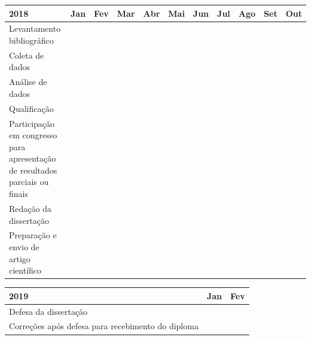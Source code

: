 \documentclass[oneside, 12pt,article, a4paper]{memoir}
\begin{document}
\begin{table}[!htb]
\footnotesize
\centering
\begin{tabular}{|p{4cm}|c|c|c|c|c|c|c|c|c|c|}
\hline
\textbf{2018} &
  \multicolumn{1}{l|}{\textbf{Jan}} &
  \multicolumn{1}{l|}{\textbf{Fev}} &
  \multicolumn{1}{l|}{\textbf{Mar}} &
  \multicolumn{1}{l|}{\textbf{Abr}} &
  \multicolumn{1}{l|}{\textbf{Mai}} &
  \multicolumn{1}{l|}{\textbf{Jun}} &
  \multicolumn{1}{l|}{\textbf{Jul}} &
  \multicolumn{1}{l|}{\textbf{Ago}} &
  \multicolumn{1}{l|}{\textbf{Set}} &
  \multicolumn{1}{l|}{\textbf{Out}} \\ \hline
Levantamento bibliográfico                                                   &  &  &  &  &  &  &  &  &  &  \\ \hline
Coleta de dados                                                              &  &  &  &  &  &  &  &  &  &  \\ \hline
Análise de dados                                                             &  &  &  &  &  &  &  &  &  &  \\ \hline
Qualificação                                                                 &  &  &  &  &  &  &  &  &  &  \\ \hline
Participação em congresso para apresentação de resultados parciais ou finais &  &  &  &  &  &  &  &  &  &  \\ \hline
Redação da dissertação                                                       &  &  &  &  &  &  &  &  &  &  \\ \hline
Preparação e envio de artigo científico                                      &  &  &  &  &  &  &  &  &  &  \\ \hline
\end{tabular}
\end{table}


\begin{table}[!htb]
\footnotesize
\begin{tabular}{|p{4cm}|c|c|}
\hline
\textbf{2019}                                     & \multicolumn{1}{l|}{\textbf{Jan}} & \multicolumn{1}{l|}{\textbf{Fev}} \\ \hline
Defesa da dissertação                             &                                   &                                   \\ \hline
Correções após defesa para recebimento do diploma &                                   &                                   \\ \hline
\end{tabular}
\end{table}




\end{document}
